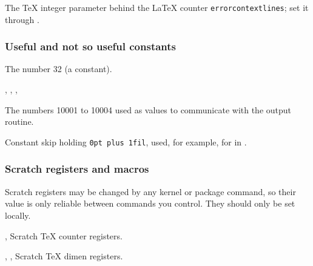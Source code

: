 \documentclass{l3in2edoc}
\begin{document}
\begin{function}[int]
  {
    \errorcontextlines
  }
  The \TeX{} integer parameter behind the \LaTeX{} counter
  \texttt{errorcontextlines}; set it through .
\end{function}





\subsubsection{Useful and not so useful constants}

\begin{function}[]
  {
    \@xxxii
  }
  The number 32 (a  constant).
\end{function}


\begin{function}[]
  {
    \@Mi,
    \@Mii,
    \@Miii,
    \@Miv
  }

  The numbers 10001 to 10004 used as  values to communicate
  with the output routine.
\end{function}


\begin{function}[]
  {
    \@flushglue
  }
  Constant skip holding \texttt{0pt plus 1fil}, used, for example,
  for  in .
\end{function}





\subsubsection{Scratch registers and macros}

Scratch registers may be changed by any kernel or package command, so
their value is only reliable between commands you control. They
should only be set locally.

\begin{function}[]
  {
    \@tempcnta,
    \@tempcntb
  }
  Scratch \TeX{} counter registers.
\end{function}



\begin{function}[]
  {
    \@tempdima,
    \@tempdimb,
    \@tempdimc
  }
  Scratch \TeX{} dimen registers.

\end{function}
\end{document}
